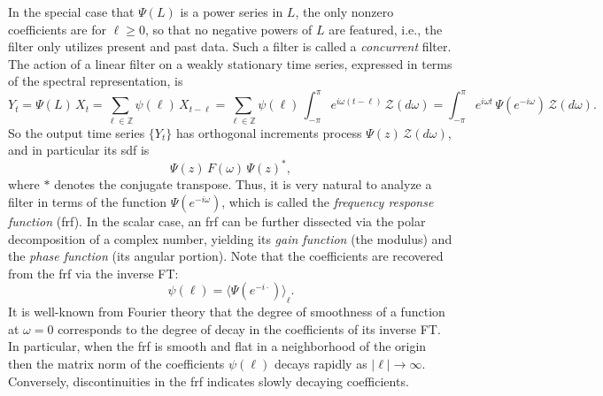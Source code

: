 \documentclass[a4paper]{book}
\def\ZZ{\mathbb Z}
\def\tends{\rightarrow}
\begin{document}
  
  In the special case that $\Psi (L)$ is a power
 series in $L$, the only nonzero coefficients are for $\ell \geq 0$, 
 so that no negative powers of $L$ are featured, i.e., the filter
 only utilizes present and past data.  Such a filter is called a 
 {\em concurrent} filter.  
  The action of   a linear  filter
 on a weakly stationary time series,
 expressed in terms of the spectral representation, is
\[
  Y_t = \Psi (L) \, X_t = \sum_{\ell \in \ZZ} \psi (\ell) \, X_{t-\ell}
   = \sum_{\ell \in \ZZ} \psi (\ell)
  \, \int_{-\pi}^{\pi} e^{i \omega (t-\ell)} \,
   \mathcal{Z} (d\omega) =
  \int_{-\pi}^{\pi} e^{i \omega t} \, \Psi (e^{-i \omega}) \,
   \mathcal{Z} (d\omega).
\]
 So the output time series $\{ Y_t \}$ has orthogonal increments process
  $\Psi (z) \, \mathcal{Z} (d\omega)$, and in particular its sdf is
\[  
   \Psi (z) \, F(\omega) \, { \Psi (z) }^{*},
\]
 where $*$ denotes the conjugate transpose.  Thus, it is very natural
 to analyze a filter in terms of the function $\Psi (e^{-i \omega})$,
 which is called the {\em frequency response function} (frf).  In 
 the scalar case, an frf can be further dissected via the polar 
 decomposition of a complex number, yielding its {\em gain function}
 (the modulus) and the {\em phase function} (its angular portion).  
  Note that the coefficients are recovered from the frf via the inverse FT:
\[
  \psi (\ell) = {\langle \Psi (e^{-i \cdot } ) \rangle }_{\ell}.
\]
  It is well-known from Fourier theory that the degree of smoothness of a
 function at $\omega = 0$ corresponds to the degree of decay in the coefficients 
 of its  inverse FT.  In particular, when the frf is smooth and flat in a
 neighborhood of the origin then the matrix norm of the 
 coefficients $\psi (\ell)$ decays rapidly as $|\ell| \tends \infty$.  Conversely,
 discontinuities in the frf indicates slowly decaying coefficients.
\end{document}

